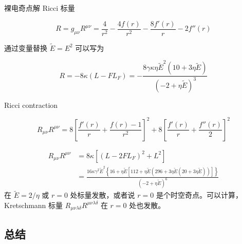 \documentclass[9pt, dvipsnames]{beamer} %
\begin{document}
\begin{frame}{裸电奇点解}
    Ricci  标量

    $$
    R
    =g_{\mu\nu} R^{\mu\nu}
    =\frac{4 }{r^2 } - \frac{4f(r) }{r^2 } - \frac{8f'(r) }{r } - 2f''(r) 
    $$

    通过变量替换 $\tilde{E}=E^2$ 可以写为
    
    $$
    R
    =-8\kappa \left(L-FL_F \right)
    =-\frac{8\gamma\kappa \eta\tilde{E}^2\left(10+3\eta\tilde{E} \right) }{\left(-2+\eta\tilde{E} \right)^3 }
    $$
    
    Ricci contraction
    
    $$
    R_{\mu\nu} R^{\mu\nu}
    =8\left[\frac{f'(r) }{r } + \frac{f(r)-1 }{r^2 }  \right]^2 + 8 \left[\frac{f'(r) }{r } + \frac{f''(r) }{2 }  \right]^2
    $$
    
    $$
    \begin{aligned}
        R_{\mu\nu} R^{\mu\nu}
        &=8\kappa\left[\left(L - 2FL_F \right)^2 + L^2 \right] \\
        &=\frac{16\kappa \gamma^2 \tilde{E}^2 \left\{16+\eta \tilde{E}\left[112+\eta\tilde{E}\left(296+3\eta \tilde{E}\left(20+3\eta\tilde{E} \right) \right) \right] \right\} }{\left(-2+\eta\tilde{E} \right)^6 }
    \end{aligned}
    $$ 
    在 $\tilde{E}=2/\eta $ 或 $r=0$ 处标量发散，或者说 $r=0$ 是个时空奇点。可以计算，Kretschmann 标量 $R_{\mu\nu\lambda\delta}R^{\mu\nu\lambda\delta}  $ 在 $r=0$ 处也发散。
\end{frame}

\subsection{总结}
\end{document}
